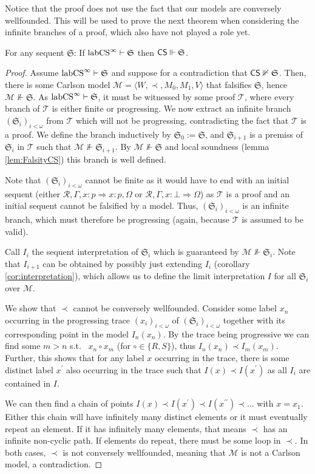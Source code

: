 \documentclass[runningheads,orivec]{llncs}
\newcommand{\CS}{\textnormal{\textsf{CS}}}
\newcommand{\labCS}{{\textnormal{labCS}^\infty}}
\newcommand{\Ra}{\Rightarrow}
\newcommand{\la}{\langle}
\newcommand{\ra}{\rangle}
\newcommand{\R}{\mathcal{R}}
\newcommand{\Mw}{\mathcal{M}}
\newcommand{\Seq}{\mathfrak{S}}
\newcommand{\tree}{\mathcal{T}}
\begin{document}
Notice that the proof does not use the fact that our models are conversely wellfounded. This will be used to prove the next theorem when considering the infinite branches of a proof, which also have not played a role yet.


\begin{theorem}[Soundness of $\labCS$] \label{thm:soundCS}
    For any sequent $\Seq$: If $\labCS \vdash \Seq$ then $\CS \Vdash \Seq$.
\end{theorem}
\begin{proof}
    Assume $\labCS \vdash \Seq$ and suppose for a contradiction that $\CS \nVdash \Seq$.
    Then, there is some Carlson model $\Mw = \la W , \prec , M_0 , M_1 , V \ra$ that falsifies $\Seq$, hence $\Mw \nVdash \Seq$. 
    As $\labCS \vdash \Seq$, it must be witnessed by some proof $\tree$, where every branch of $\tree$ is either finite or progressing. We now extract an infinite branch $(\Seq_i)_{i < \omega }$ from $\tree$ which will not be progressing, contradicting the fact that $\tree$ is a proof. We define the branch inductively by $\Seq_0 := \Seq$, and $\Seq_{i+1}$ is a premiss of $\Seq_i$ in $\tree$ such that $\Mw \nVdash \Seq_{i+1}$. By $\Mw \nVdash \Seq$ and local soundness (lemma \ref{lem:FalsityCS}) this branch is well defined. 
    
    Note that $(\Seq_i)_{i < \omega }$ cannot be finite as it would have to end with an initial sequent (either $\R , \Gamma , x : p \Ra x : p , \Omega$ or $\R , \Gamma , x : \bot \Ra \Omega$) as $\tree$ is a proof and an initial sequent cannot be falsified by a model. Thus, $(\Seq_i)_{i < \omega }$ is an infinite branch, which must therefore be progressing (again, because $\tree$ is assumed to be valid). 

    Call $I_i$ the sequent interpretation of $\Seq_i$ which is guaranteed by $\Mw \nVdash \Seq_i$. Note that $I_{i+1}$ can be obtained by possibly just extending $I_{i}$ (corollary \ref{cor:interpretation}), which allows us to define the limit interpretation $I$ for all $\Seq_i$ over $\Mw$.
    
    We show that $\prec$ cannot be conversely wellfounded.
    Consider some label $x_n$ occurring in the progressing trace  $(x_i)_{i < \omega }$ of $(\Seq_i)_{i < \omega }$ together with its corresponding point in the model $I_n(x_n)$. By the trace being progressive we can find some $m > n$ s.t.~ $x_n \circ x_m$ (for $\circ \in \{R,S\}$), thus $I_n(x_n) \prec I_m (x_m)$. 
    Further, this shows that for any label $x$ occurring in the trace, there is some distinct label $x^\prime$ also occurring in the trace such that $I(x) \prec I(x^\prime)$ as all $I_i$ are contained in $I$. 

    We can then find a chain of points $I(x) \prec I(x^\prime) \prec I(x^{\prime\prime}) \prec ...$ with $x=x_1$. Either this chain will have infinitely many distinct elements or it must eventually repeat an element. If it has infinitely many elements, that means $\prec$ has an infinite non-cyclic path. If elements do repeat, there must be some loop in $\prec$.
    In both cases, $\prec$ is not conversely wellfounded, meaning that $\Mw$ is not a Carlson model, a contradiction.
\end{proof}
\end{document}
